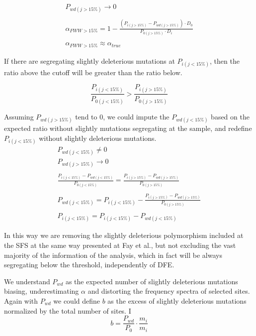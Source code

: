 \documentclass[11pt]{article}
\begin{document}
\begin{equation}
	\begin{gathered}
		P_{wd(j > 15\%)} \to 0\\\\
		\alpha_{FWW > 15\%} = 1 - \frac{(P_{i(j > 15\%)} - P_{wd(j > 15\%)}) \cdot D_{0}}{P_{0(j>15\%)} \cdot D_{i}}\\\\
		\alpha_{FWW > 15\%} \approx \alpha_{true}
	\end{gathered}
\end{equation}

If there are segregating slightly deleterious mutations at $P_{i(j < 15\%)}$, then the ratio above the cutoff will be greater than the ratio below. 

\begin{equation}
		\frac{P_{i(j < 15\%)}}{P_{0(j<15\%)}} > \frac{P_{i(j > 15\%)}}{P_{0(j>15\%)}}		
\end{equation}

Assuming $P_{wd(j>15\%)}$ tend to 0, we could impute the $P_{wd(j<15\%)}$ based on the expected ratio without slightly mutations segregating at the sample, and redefine $P_{i(j<15\%)}$ without slightly deleterious mutations. 
\begin{equation}
	\begin{gathered}
		P_{wd(j < 15\%)} \ne 0\\
		P_{wd(j > 15\%)} \to 0\\\\
		\frac{P_{i(j < 15\%)} - P_{wd(j < 15\%)}}{P_{0(j<15\%)}} = \frac{P_{i(j > 15\%)} - P_{wd(j > 15\%)}}{P_{0(j>15\%)}}\\\\
		P_{wd(j < 15\%)} = P_{i(j < 15\%)} - \frac{P_{i(j > 15\%)} - P_{wd(j > 15\%)}}{P_{0(j>15\%)}}\\\\
		P_{i(j < 15\%)} = P_{i(j < 15\%)} - P_{wd(j < 15\%)}
	\end{gathered}
\end{equation}

In this way we are removing the slightly deleterious polymorphism included at the SFS at the same way presented at Fay et al., but not excluding the vast majority of the information of the analysis, which in fact will be always segregating below the threshold, independently of DFE. 

We understand $P_{wd}$ as the expected number of slightly deleterious mutations biasing,  underestimating $\alpha$ and distorting the frequency spectra of selected sites. Again with $P_{wd}$ we could define $b$ as the excess of slightly deleterious mutations normalized by the total number of sites. I
\begin{equation}
	b = \frac{P_{wd}}{P_{0}} \cdot \frac{m_{i}}{m_{i}}
\end{equation}
\end{document}
